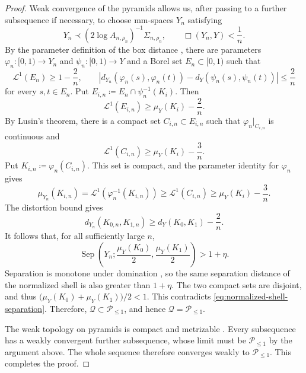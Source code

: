 \documentclass{amsart}
\numberwithin{equation}{section}
\theoremstyle{plain}
\theoremstyle{definition}
\theoremstyle{remark}
\newcommand{\Ple}{\mathcal{P}_{\le 1}}
\DeclareMathOperator{\Sep}{Sep}
\begin{document}
\begin{proof}
	Weak convergence of the pyramids allows us, after passing to a further
	subsequence if necessary, to choose mm-spaces $Y_n$ satisfying
\[ Y_n\prec(2\log A_{n,\rho_n})^{-1}\Sigma_{n,\rho_n}, \qquad \Box(Y_n,Y)<\frac1n. \]
	By the parameter definition of the box distance
	\cite[Definition~4.4]{shioya2016mmg}, there are parameters
	$\varphi_n\colon[0,1)\to Y_n$ and $\psi_n\colon[0,1)\to Y$ and a Borel
	set $E_n\subset[0,1)$ such that
	\[
		\mathcal L^1(E_n)\ge1-\frac2n,\qquad
		|d_{Y_n}(\varphi_n(s),\varphi_n(t))-d_Y(\psi_n(s),\psi_n(t))|\le\frac2n
	\]
	for every $s,t\in E_n$.  Put
	$E_{i,n}\coloneqq E_n\cap\psi_n^{-1}(K_i)$.  Then
	\[
		\mathcal L^1(E_{i,n})\ge\mu_Y(K_i)-\frac2n.
	\]
	By Lusin's theorem, there is a compact set $C_{i,n}\subset E_{i,n}$ such
	that $\varphi_n|_{C_{i,n}}$ is continuous and
	\[
		\mathcal L^1(C_{i,n})\ge\mu_Y(K_i)-\frac3n.
	\]
	Put $K_{i,n}\coloneqq\varphi_n(C_{i,n})$. This set is compact, and the
	parameter identity for $\varphi_n$ gives
	\[
		\mu_{Y_n}(K_{i,n})
		=\mathcal L^1(\varphi_n^{-1}(K_{i,n}))
		\ge\mathcal L^1(C_{i,n})
		\ge\mu_Y(K_i)-\frac3n.
	\]
	The distortion bound gives
	\[
		d_{Y_n}(K_{0,n},K_{1,n})\ge d_Y(K_0,K_1)-\frac2n.
	\]
	It follows that, for all sufficiently large $n$,
	\[
		\Sep\left(Y_n;\frac{\mu_Y(K_0)}2,\frac{\mu_Y(K_1)}2\right)>1+\eta.
	\]
	Separation is monotone under domination
	\cite[Lemma~2.25]{shioya2016mmg}, so the same separation distance of the
	normalized shell is also greater than $1+\eta$.  The two compact sets
	are disjoint, and thus
	$\bigl(\mu_Y(K_0)+\mu_Y(K_1)\bigr)/2<1$.  This contradicts
	\eqref{eq:normalized-shell-separation}.  Therefore,
	$\mathcal Q\subset\Ple$, and hence $\mathcal Q=\Ple$.

	The weak topology on pyramids is compact and metrizable
	\cite[Theorem~6.22]{shioya2016mmg}.  Every subsequence has a weakly
	convergent further subsequence, whose limit must be $\Ple$ by the
	argument above.  The whole sequence therefore converges weakly to
	$\Ple$.  This completes the proof.
\end{proof}
\end{document}
